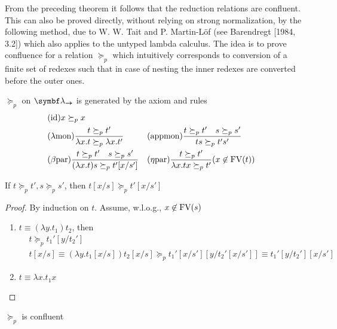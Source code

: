 \documentclass[11pt]{article}
\begin{document}
From the preceding theorem it follows that the reduction relations are
confluent. This can also be proved directly, without relying on strong
normalization, by the following method, due to W. W. Tait and P. Martin-Löf
(see Barendregt [1984, 3.2]) which also applies to the untyped lambda calculus.
The idea is to prove confluence for a relation \(\succeq_p\) which intuitively
corresponds to conversion of a finite set of redexes such that in case of
nesting the 
inner redexes are converted before the outer ones.
\begin{definition}[]
\(\succeq_p\) on \(\blambda_{\bto}\) is generated by the axiom and rules
\begin{alignat*}{2}
&(\text{id})x\succeq_p x\\
&(\lambda\text{mon})\frac{t\succeq_p t'}{\lambda x.t\succeq_p \lambda x.t'}&&
(\text{appmon})\frac{t\succeq_p t'\quad s\succeq_p s'}{ts\succeq_p t's'}\\
&(\beta\text{par})\frac{t\succeq_p t'\quad s\succeq_ps'}{(\lambda x.t)s\succeq_pt'[x/s']}
&&(\eta\text{par})\frac{t\succeq_p t'}{\lambda x.tx\succeq_pt'}
(x\not\in\text{FV}(t))
\end{alignat*}
\end{definition}

\begin{lemma}
If \(t\succeq_p t',s\succeq_p s'\), then \(t[x/s]\succeq_p t'[x/s']\)
\end{lemma}

\begin{proof}
By induction on \(t\). Assume, w.l.o.g., \(x\not\in\text{FV}(s)\)

\begin{enumerate}
\item \(t\equiv(\lambda y.t_1)t_2\), then
\begin{align*}
&t\succeq_p t_1'[y/t_2']\\
&t[x/s]\equiv(\lambda y.t_1[x/s])t_2[x/s]\succeq_p
t_1'[x/s'][y/t_2'[x/s']]\equiv
t_1'[y/t_2'][x/s']
\end{align*}
\item \(t\equiv\lambda x.t_1x\)
\end{enumerate}
\end{proof}

\begin{lemma}[]
\(\succeq_p\) is confluent
\end{lemma}
\end{document}
